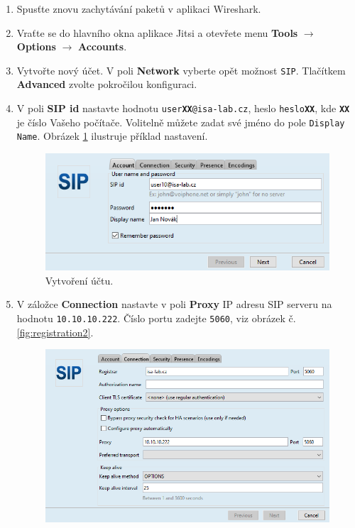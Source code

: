 \begin{enumerate}
    \item Spusťte znovu zachytávání paketů v aplikaci Wireshark.
    \item Vraťte se do hlavního okna aplikace Jitsi a otevřete menu {\bf Tools} $\rightarrow$ {\bf Options} $\rightarrow$ {\bf Accounts}.
    \item Vytvořte nový účet. V poli {\bf Network} vyberte opět možnost {\tt SIP}. Tlačítkem {\bf Advanced} zvolte pokročilou konfiguraci.
    \item V poli {\bf SIP id} nastavte hodnotu {\tt user{\bf XX}@isa-lab.cz}, heslo {\tt heslo{\bf XX}}, kde {\tt\bf XX} je číslo Vašeho počítače. Volitelně můžete zadat své jméno do pole {\tt Display Name}. Obrázek \ref{fig:registration1} ilustruje příklad nastavení.
      \begin{figure}[h!]
        \centering
        \includegraphics[scale=0.7]{img/jitsi-registration1b.png}
        \caption{Vytvoření účtu.}
        \label{fig:registration1}
      \end{figure}
    \item V záložce {\bf Connection} nastavte v poli {\bf Proxy} IP adresu SIP serveru na hodnotu {\tt 10.10.10.222}. Číslo portu zadejte {\tt 5060}, viz obrázek č. \ref{fig:registration2}. 
      \begin{figure}[h!]
        \centering
        \includegraphics[scale=0.7]{img/jitsi-registration2b.png}

\end{figure}
\end{enumerate}
